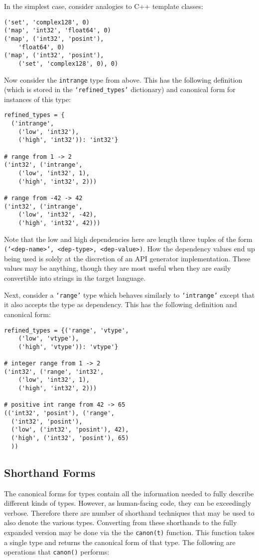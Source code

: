 \documentclass{ansconfpaper}
\newcommand{\vin}[1]{\texttt{{#1}}}
\begin{document}
In the simplest case, consider analogies to C++ template classes:
\begin{lstlisting}
('set', 'complex128', 0)
('map', 'int32', 'float64', 0)
('map', ('int32', 'posint'), 
    'float64', 0)
('map', ('int32', 'posint'), 
    ('set', 'complex128', 0), 0)
\end{lstlisting}
Now consider the \vin{intrange} type from above. This has the following definition 
(which is stored in the \vin{`refined\_types'} dictionary) and canonical form for 
instances of this type:
\begin{lstlisting}
refined_types = {
  ('intrange', 
    ('low', 'int32'), 
    ('high', 'int32')): 'int32'}

# range from 1 -> 2
('int32', ('intrange', 
    ('low', 'int32', 1), 
    ('high', 'int32', 2)))

# range from -42 -> 42
('int32', ('intrange', 
    ('low', 'int32', -42), 
    ('high', 'int32', 42)))
\end{lstlisting}
Note that the low and high dependencies here are length three tuples of the form
\vin{(`<dep-name>', <dep-type>, <dep-value>)}.  How the dependency values end up 
being used is solely at the discretion of an API generator implementation.  These 
values may be anything, though they are most useful when they are easily convertible 
into strings in the target language.

Next, consider a \vin{`range'} type which behaves similarly to \vin{`intrange'} 
except that it also accepts the type as dependency.  This has the following 
definition and canonical form:
\begin{lstlisting}
refined_types = {('range', 'vtype', 
    ('low', 'vtype'), 
    ('high', 'vtype')): 'vtype'}
    
# integer range from 1 -> 2
('int32', ('range', 'int32', 
    ('low', 'int32', 1), 
    ('high', 'int32', 2)))    

# positive int range from 42 -> 65
(('int32', 'posint'), ('range', 
  ('int32', 'posint'),
  ('low', ('int32', 'posint'), 42),
  ('high', ('int32', 'posint'), 65)
  ))
\end{lstlisting}

\subsection{Shorthand Forms}
\label{sec:shorhand}

The canonical forms for types contain all the information needed to fully describe
different kinds of types.  However, as human-facing code, they can be exceedingly 
verbose.  Therefore there are number of shorthand techniques that may be used to 
also denote the various types.  Converting from these shorthands to the fully
expanded version may be done via the the \vin{canon(t)} function.  This function
takes a single type and returns the canonical form of that type.  The following
are operations that \vin{canon()}  performs:
\end{document}
